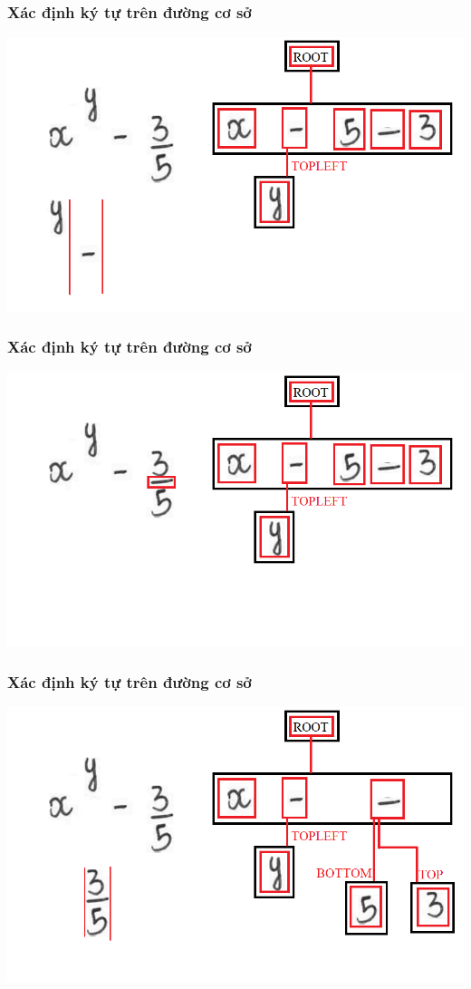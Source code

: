 \documentclass{beamer}
\begin{document}
\begin{frame}
	\frametitle{Xác định ký tự trên đường cơ sở}
	\begin{center}
		\centering
		\includegraphics[width=0.6\linewidth]{hor5_5.png}
	\end{center}
\end{frame}

\begin{frame}
	\frametitle{Xác định ký tự trên đường cơ sở}
	\begin{center}
		\centering
		\includegraphics[width=0.6\linewidth]{hor6.png}
	\end{center}
\end{frame}

\begin{frame}
	\frametitle{Xác định ký tự trên đường cơ sở}
	\begin{center}
		\centering
		\includegraphics[width=0.6\linewidth]{hor7.png}
	\end{center}
\end{frame}
\end{document}
